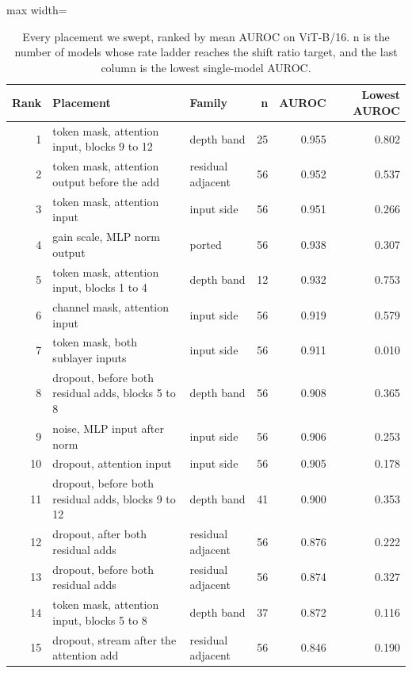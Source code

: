 \begin{table}[htbp]
\centering
\small
\caption{Every placement we swept, ranked by mean AUROC on ViT-B/16. n is the number of models whose rate ladder reaches the shift ratio target, and the last column is the lowest single-model AUROC.}
\label{tab:basis-ranking}
\begin{adjustbox}{max width=\linewidth}
\begin{tabular}{rllrrr}
\toprule
Rank & Placement & Family & n & AUROC & Lowest AUROC \\
\midrule
1 & token mask, attention input, blocks 9 to 12 & depth band & 25 & 0.955 & 0.802 \\
2 & token mask, attention output before the add & residual adjacent & 56 & 0.952 & 0.537 \\
3 & token mask, attention input & input side & 56 & 0.951 & 0.266 \\
4 & gain scale, MLP norm output & ported & 56 & 0.938 & 0.307 \\
5 & token mask, attention input, blocks 1 to 4 & depth band & 12 & 0.932 & 0.753 \\
6 & channel mask, attention input & input side & 56 & 0.919 & 0.579 \\
7 & token mask, both sublayer inputs & input side & 56 & 0.911 & 0.010 \\
8 & dropout, before both residual adds, blocks 5 to 8 & depth band & 56 & 0.908 & 0.365 \\
9 & noise, MLP input after norm & input side & 56 & 0.906 & 0.253 \\
10 & dropout, attention input & input side & 56 & 0.905 & 0.178 \\
11 & dropout, before both residual adds, blocks 9 to 12 & depth band & 41 & 0.900 & 0.353 \\
12 & dropout, after both residual adds & residual adjacent & 56 & 0.876 & 0.222 \\
13 & dropout, before both residual adds & residual adjacent & 56 & 0.874 & 0.327 \\
14 & token mask, attention input, blocks 5 to 8 & depth band & 37 & 0.872 & 0.116 \\
15 & dropout, stream after the attention add & residual adjacent & 56 & 0.846 & 0.190 \\

\end{tabular}
\end{adjustbox}
\end{table}
